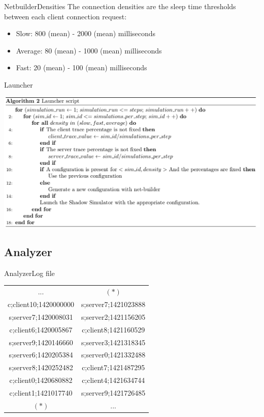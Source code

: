 	\begin{frame}{Netbuilder}{Densities}
		The connection densities are the sleep time thresholds between each client connection request:
			
		\begin{itemize}
			\item Slow: 800 (mean) - 2000 (mean) milliseconds 			
			\item Average: 80 (mean)  - 1000 (mean) milliseconds
			\item Fast: 20 (mean) - 100 (mean) milliseconds
		\end{itemize}
	\end{frame}			
	

	\begin{frame}{Launcher}
		\begin{center}
			\includegraphics[scale=0.30]{img/algolauncher.png}
		\end{center}				

	\end{frame}

\subsection{Analyzer}
	\begin{frame}{Analyzer}{Log file}
		\begin{center}
			\begin{tabular}{c | c}
			...&$(*)$\\
			c;client10;1420000000&
			s;server7;1421023888\\
			s;server7;1420008031&
			s;server2;1421156205\\
			c;client6;1420005867&
			c;client8;1421160529\\
			s;server9;1420146660&
			s;server3;1421318345\\
			s;server6;1420205384&
			s;server0;1421332488\\
			s;server8;1420252482&
			c;client7;1421487295\\
			c;client0;1420680882&
			c;client4;1421634744\\
			c;client1;1421017740&
			s;server9;1421726485\\
			$(*)$  & ...
			\end{tabular}	
		\end{center}
	\end{frame}

